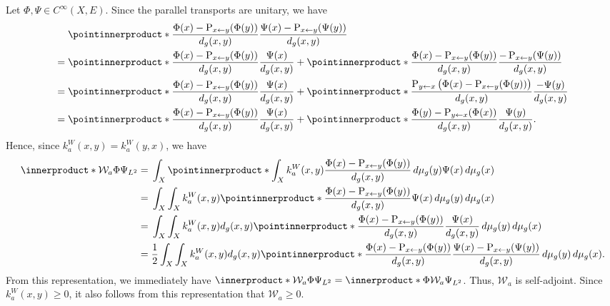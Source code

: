 \documentclass[a4paper,oneside,12pt]{amsart}
\theoremstyle{plain}
\theoremstyle{definition}
\theoremstyle{remark}
\newcommand{\dvol}{d\mu}
\newcommand{\paralleltransport}[2]{\operatorname{P}_{#2 \gets #1}}
\newcommand{\mesoscopicWilsonterm}[1][a]{\mathcal{W}_{#1}}
\newcommand{\integralkernel}{k}
\newcommand{\kernelWilson}{\integralkernel_a^W}
\begin{document}
Let $\Phi, \Psi \in C^{\infty}(X,E)$.
Since the parallel transports are unitary, we have
\begin{equation}
  \begin{aligned}
  & \pointinnerproduct*{\frac{\Phi(x) - \paralleltransport{y}{x}(\Phi(y))}{d_g(x,y)}}{\frac{\Psi(x) - \paralleltransport{y}{x}(\Psi(y))}{d_g(x,y)}} \\
  ={}& \pointinnerproduct*{\frac{\Phi(x) - \paralleltransport{y}{x}(\Phi(y))}{d_g(x,y)}}{\frac{\Psi(x)}{d_g(x,y)}} + \pointinnerproduct*{\frac{\Phi(x)-\paralleltransport{y}{x}(\Phi(y))}{d_g(x,y)}}{\frac{-\paralleltransport{y}{x}(\Psi(y))}{d_g(x,y)}} \\
  ={}& \pointinnerproduct*{\frac{\Phi(x) - \paralleltransport{y}{x}(\Phi(y))}{d_g(x,y)}}{\frac{\Psi(x)}{d_g(x,y)}} + \pointinnerproduct*{\frac{\paralleltransport{x}{y}\big(\Phi(x)-\paralleltransport{y}{x}(\Phi(y))\big)}{d_g(x,y)}}{\frac{-\Psi(y)}{d_g(x,y)}} \\
  ={}& \pointinnerproduct*{\frac{\Phi(x) - \paralleltransport{y}{x}(\Phi(y))}{d_g(x,y)}}{\frac{\Psi(x)}{d_g(x,y)}} + \pointinnerproduct*{\frac{\Phi(y)-\paralleltransport{x}{y}(\Phi(x))}{d_g(x,y)}}{\frac{\Psi(y)}{d_g(x,y)}}.
  \end{aligned}
\end{equation}
Hence, since $\kernelWilson(x,y) = \kernelWilson(y,x)$, we have
\begin{equation}
  \begin{aligned}
    \innerproduct*{\mesoscopicWilsonterm \Phi}{\Psi}_{L^2} ={}& \int_X \pointinnerproduct*{\int_X \kernelWilson(x,y) \frac{\Phi(x) - \paralleltransport{y}{x}(\Phi(y))}{d_g(x,y)} \,\dvol_g(y)}{\Psi(x)} \,\dvol_g(x) \\
    ={}& \int_X \int_X \kernelWilson(x,y) \pointinnerproduct*{\frac{\Phi(x) - \paralleltransport{y}{x}(\Phi(y))}{d_g(x,y)}}{\Psi(x)} \,\dvol_g(y) \,\dvol_g(x) \\
    ={}& \int_X \int_X \kernelWilson(x,y) d_g(x,y) \pointinnerproduct*{\frac{\Phi(x) - \paralleltransport{y}{x}(\Phi(y))}{d_g(x,y)}}{\frac{\Psi(x)}{d_g(x,y)}} \,\dvol_g(y) \,\dvol_g(x) \\
    ={}& \frac{1}{2} \int_X \int_X \kernelWilson(x,y) d_g(x,y) \pointinnerproduct*{\frac{\Phi(x) - \paralleltransport{y}{x}(\Phi(y))}{d_g(x,y)}}{\frac{\Psi(x) - \paralleltransport{y}{x}(\Psi(y))}{d_g(x,y)}} \,\dvol_g(y) \,\dvol_g(x).
  \end{aligned}
\end{equation}
From this representation, we immediately have $\innerproduct*{\mesoscopicWilsonterm \Phi}{\Psi}_{L^2} = \innerproduct*{\Phi}{\mesoscopicWilsonterm  \Psi}_{L^2}$.
Thus, $\mesoscopicWilsonterm$ is self-adjoint.
Since $\kernelWilson(x,y) \ge 0$, it also follows from this representation that $\mesoscopicWilsonterm \ge 0$.
\end{document}
